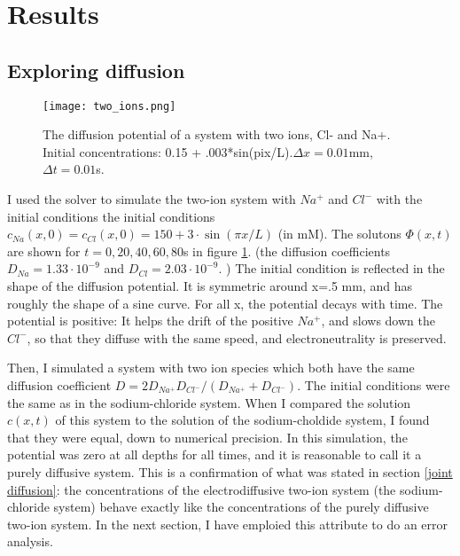 \documentclass{article}
\begin{document}
\section{Results}
\subsection{Exploring diffusion} \label{exploring diffusion}

\begin{figure}
  \texttt{[image: two\_ions.png]}
  \caption{The diffusion potential of a system with two ions, Cl- and Na+. Initial concentrations: 0.15 + .003*sin(pix/L).$\Delta x = 0.01$mm, $\Delta t = 0.01 $s. }
  \label{fig:two_ions}
\end{figure}

I used the solver to simulate the two-ion system with $Na^+$ and $Cl^-$ with the initial conditions the initial conditions $c_{Na}(x,0)=c_{Cl}(x,0)=150+3\cdot \sin(\pi x/L)$ (in mM). The solutons $\Phi(x,t)$ are shown for $t= 0,20,40,60,80$s in figure \ref{fig:two_ions}. (the diffusion coefficients $D_{Na} = 1.33\cdot 10^{-9}$  and $D_{Cl} = 2.03\cdot 10^{-9}$. ) The initial condition is reflected in the shape of the diffusion potential. It is symmetric around x=.5 mm, and has roughly the shape of a sine curve. For all x, the potential decays with time. The potential is positive: It helps the drift of the positive $Na^+$, and slows down the $Cl^-$, so that they diffuse with the same speed, and electroneutrality is preserved.

Then, I simulated a system with two ion species which both have the same diffusion coefficient $D=2D_{Na^+}D_{Cl^-}/(D_{Na^+}+D_{Cl^-})$. The initial conditions were the same as in the sodium-chloride system. When I compared the solution $c(x,t)$ of this system to the solution of the sodium-choldide system, I found that they were equal, down to numerical precision. In this simulation, the potential was zero at all depths for all times, and it is reasonable to call it a purely diffusive system. This is a confirmation of what was stated in section \ref{joint diffusion}: the concentrations of the electrodiffusive two-ion system (the sodium-chloride system) behave exactly like the concentrations of the purely diffusive two-ion system. In the next section, I have emploied this attribute to do an error analysis. 
\end{document}
